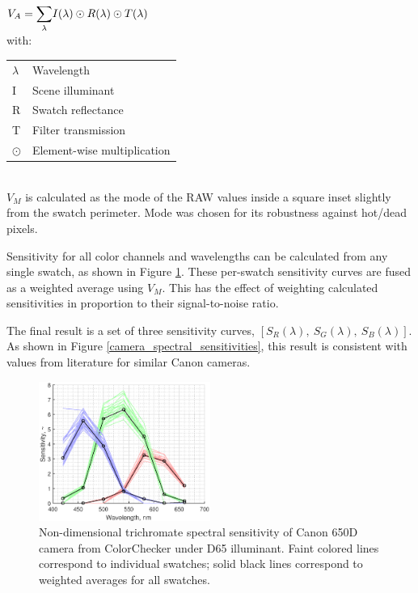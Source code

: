 \documentclass[twocolumn,10pt]{asme2ej}
\newcommand{\id}{\hspace{6 mm}}
\begin{document}
$V_A = \mathlarger{\sum_{\lambda}} I(\lambda) \odot R(\lambda) \odot T(\lambda)$ \\

with: \\

\begin{tabular}{l | l}
$\lambda$ & Wavelength \\
I & Scene illuminant\\
R & Swatch reflectance \\
T & Filter transmission \\
$\odot$ & Element-wise multiplication \\
\end{tabular} \\

$V_M$ is calculated as the mode of the RAW values inside a square inset slightly from the swatch perimeter. Mode was chosen for its robustness against hot/dead pixels.

\id Sensitivity for all color channels and wavelengths can be calculated from any single swatch, as shown in Figure \ref{canon_650d_sensitivity}. These per-swatch sensitivity curves are fused as a weighted average using $V_M$. This has the effect of weighting calculated sensitivities in proportion to their signal-to-noise ratio.

\id The final result is a set of three sensitivity curves, $\left[ S_R(\lambda), \ S_G(\lambda), \ S_B(\lambda) \right]$. As shown in Figure \ref{camera_spectral_sensitivities}, this result is consistent with values from literature for similar Canon cameras.

\begin{figure}
\centering
\includegraphics[width=0.5\textwidth]{canon_650d_sensitivity.eps}
\caption{Non-dimensional trichromate spectral sensitivity of Canon 650D camera from ColorChecker under D65 illuminant. Faint colored lines correspond to individual swatches; solid black lines correspond to weighted averages for all swatches.}
\label{canon_650d_sensitivity}
\end{figure}
\end{document}
